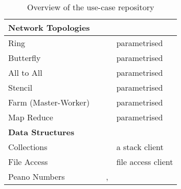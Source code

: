 \begin{table}[!h]
\begin{center}
\begin{tabular}{|l|l|l|l|}
	\hline
	\hline
	\multicolumn{4}{|l|}{ \textbf{Network Topologies}}
	\\
	\hline
	Ring & \cite{BerkleyPar} & \MPI & parametrised
	\\
	Butterfly & \cite{BerkleyPar} & \MPI & parametrised
	\\
	All to All & \cite{BerkleyPar} & \MPI & parametrised
	\\
	Stencil & \cite{BerkleyPar} & \MPI & parametrised
	\\
	Farm (Master-Worker) & \cite{BerkleyPar} & \MPI & parametrised
	\\
	Map Reduce & \cite{BerkleyPar} & \MPI & parametrised
	\\
	
	\hline
	\hline
	\multicolumn{4}{|l|}{ \textbf{Data Structures}}
	\\
	\hline
	Collections & \cite{mungo} & \TypeState  & a stack client
	\\
	File Access & \cite{mungo} & \TypeState & file access client
	\\
	Peano Numbers & \cite{citation_needed} & \GV, \Links &
	\\
	\hline
\end{tabular}
\end{center}
\caption{Overview of the use-case repository }
\label{table:use_cases_all}
\end{table}

